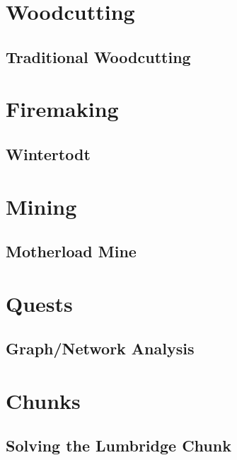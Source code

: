 \documentclass[10pt,a4paper]{report}
\begin{document}
	\part{Woodcutting}
		\chapter{Traditional Woodcutting}
			
	
	\part{Firemaking}
		\chapter{Wintertodt}
			
	
	\part{Mining}
		\chapter{Motherload Mine}
				
	
	\part{Quests}
		\chapter{Graph/Network Analysis}
			


	\part{Chunks}
		\chapter{Solving the Lumbridge Chunk}
		




\end{document}
